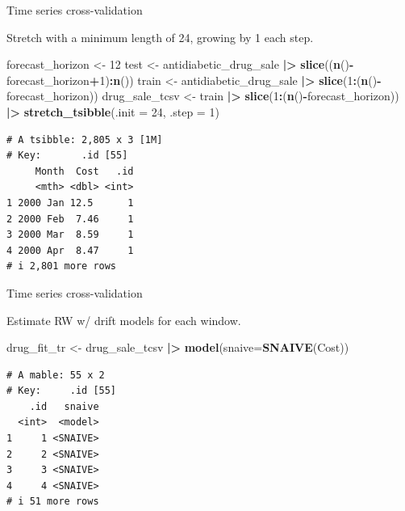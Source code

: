 \documentclass[
  14pt,
  ignorenonframetext,
  aspectratio=169,
]{beamer}
\newenvironment{Shaded}{\begin{snugshade}}{\end{snugshade}}
\newcommand{\AttributeTok}[1]{\textcolor[rgb]{0.13,0.29,0.53}{#1}}
\newcommand{\DecValTok}[1]{\textcolor[rgb]{0.00,0.00,0.81}{#1}}
\newcommand{\FunctionTok}[1]{\textcolor[rgb]{0.13,0.29,0.53}{\textbf{#1}}}
\newcommand{\NormalTok}[1]{#1}
\newcommand{\OtherTok}[1]{\textcolor[rgb]{0.56,0.35,0.01}{#1}}
\newcommand{\SpecialCharTok}[1]{\textcolor[rgb]{0.81,0.36,0.00}{\textbf{#1}}}
\renewenvironment{Shaded}{\vspace*{0.15cm}\color{black}\fontsize{10}{10}\sf\begin{snugshade}\color{black}}{\end{snugshade}}
\begin{document}
\begin{frame}[fragile]{Time series cross-validation}
\protect{}\label{time-series-cross-validation-3}
\fontsize{12}{13}\sf

Stretch with a minimum length of 24, growing by 1 each step.

\begin{Shaded}
\begin{Highlighting}[]
\NormalTok{forecast\_horizon }\OtherTok{\textless{}{-}} \DecValTok{12}
\NormalTok{test }\OtherTok{\textless{}{-}}\NormalTok{ antidiabetic\_drug\_sale }\SpecialCharTok{|\textgreater{}} 
  \FunctionTok{slice}\NormalTok{((}\FunctionTok{n}\NormalTok{()}\SpecialCharTok{{-}}\NormalTok{forecast\_horizon}\SpecialCharTok{+}\DecValTok{1}\NormalTok{)}\SpecialCharTok{:}\FunctionTok{n}\NormalTok{())}
\NormalTok{train }\OtherTok{\textless{}{-}}\NormalTok{ antidiabetic\_drug\_sale }\SpecialCharTok{|\textgreater{}} 
  \FunctionTok{slice}\NormalTok{(}\DecValTok{1}\SpecialCharTok{:}\NormalTok{(}\FunctionTok{n}\NormalTok{()}\SpecialCharTok{{-}}\NormalTok{forecast\_horizon))}
\NormalTok{drug\_sale\_tcsv }\OtherTok{\textless{}{-}}\NormalTok{  train }\SpecialCharTok{|\textgreater{}} \FunctionTok{slice}\NormalTok{(}\DecValTok{1}\SpecialCharTok{:}\NormalTok{(}\FunctionTok{n}\NormalTok{()}\SpecialCharTok{{-}}\NormalTok{forecast\_horizon)) }\SpecialCharTok{|\textgreater{}} 
  \FunctionTok{stretch\_tsibble}\NormalTok{(}\AttributeTok{.init =} \DecValTok{24}\NormalTok{, }\AttributeTok{.step =} \DecValTok{1}\NormalTok{)}
\end{Highlighting}
\end{Shaded}

\fontsize{10}{11}\sf

\begin{verbatim}
# A tsibble: 2,805 x 3 [1M]
# Key:       .id [55]
     Month  Cost   .id
     <mth> <dbl> <int>
1 2000 Jan 12.5      1
2 2000 Feb  7.46     1
3 2000 Mar  8.59     1
4 2000 Apr  8.47     1
# i 2,801 more rows
\end{verbatim}
\end{frame}

\begin{frame}[fragile]{Time series cross-validation}
\protect{}\label{time-series-cross-validation-4}
\small

Estimate RW w/ drift models for each window.

\begin{Shaded}
\begin{Highlighting}[]
\NormalTok{drug\_fit\_tr }\OtherTok{\textless{}{-}}\NormalTok{ drug\_sale\_tcsv }\SpecialCharTok{|\textgreater{}} 
  \FunctionTok{model}\NormalTok{(}\AttributeTok{snaive=}\FunctionTok{SNAIVE}\NormalTok{(Cost))}
\end{Highlighting}
\end{Shaded}

\fontsize{10}{11}\sf

\begin{verbatim}
# A mable: 55 x 2
# Key:     .id [55]
    .id   snaive
  <int>  <model>
1     1 <SNAIVE>
2     2 <SNAIVE>
3     3 <SNAIVE>
4     4 <SNAIVE>
# i 51 more rows
\end{verbatim}
\end{frame}
\end{document}
